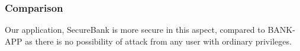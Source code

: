 \subsubsection{Comparison}
Our application, SecureBank is more secure in this aspect, compared to BANK-APP as there is no possibility of attack from any user with ordinary privileges.
\clearpage